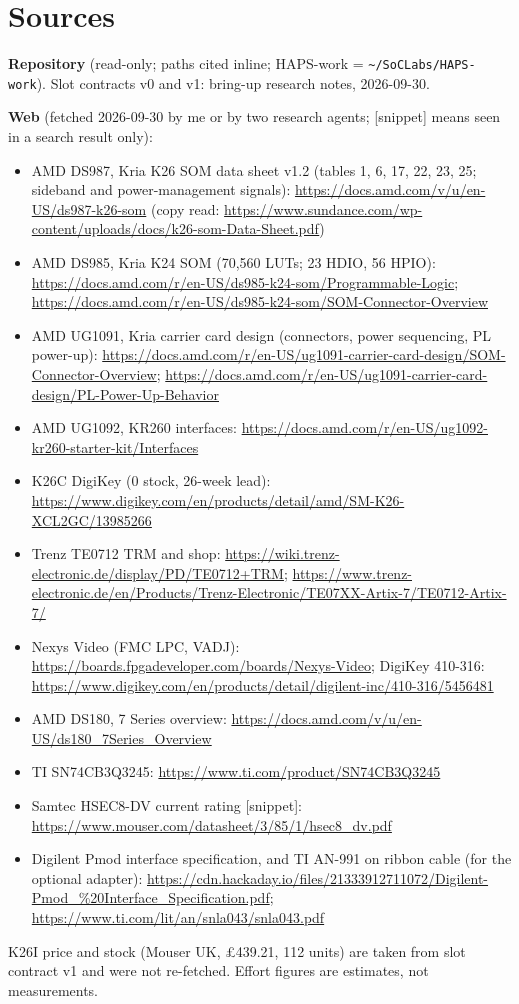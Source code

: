 \documentclass[10pt,a4paper]{article}
\newcommand\snip{\textcolor{warn}{[snippet]}}
\begin{document}
\section*{Sources}
{\scriptsize\raggedright
\textbf{Repository} (read-only; paths cited inline; HAPS-work = \texttt{\textasciitilde/SoCLabs/HAPS-work}). Slot contracts v0 and v1: bring-up research notes, 2026-09-30.\par
\textbf{Web} (fetched 2026-09-30 by me or by two research agents; \snip{} means seen in a search result only):
\begin{itemize}[leftmargin=1.2em]
\item AMD DS987, Kria K26 SOM data sheet v1.2 (tables 1, 6, 17, 22, 23, 25; sideband and power-management signals): \url{https://docs.amd.com/v/u/en-US/ds987-k26-som} (copy read: \url{https://www.sundance.com/wp-content/uploads/docs/k26-som-Data-Sheet.pdf})
\item AMD DS985, Kria K24 SOM (70,560 LUTs; 23 HDIO, 56 HPIO): \url{https://docs.amd.com/r/en-US/ds985-k24-som/Programmable-Logic}; \url{https://docs.amd.com/r/en-US/ds985-k24-som/SOM-Connector-Overview}
\item AMD UG1091, Kria carrier card design (connectors, power sequencing, PL power-up): \url{https://docs.amd.com/r/en-US/ug1091-carrier-card-design/SOM-Connector-Overview}; \url{https://docs.amd.com/r/en-US/ug1091-carrier-card-design/PL-Power-Up-Behavior}
\item AMD UG1092, KR260 interfaces: \url{https://docs.amd.com/r/en-US/ug1092-kr260-starter-kit/Interfaces}
\item K26C DigiKey (0 stock, 26-week lead): \url{https://www.digikey.com/en/products/detail/amd/SM-K26-XCL2GC/13985266}
\item Trenz TE0712 TRM and shop: \url{https://wiki.trenz-electronic.de/display/PD/TE0712+TRM}; \url{https://www.trenz-electronic.de/en/Products/Trenz-Electronic/TE07XX-Artix-7/TE0712-Artix-7/}
\item Nexys Video (FMC LPC, VADJ): \url{https://boards.fpgadeveloper.com/boards/Nexys-Video}; DigiKey 410-316: \url{https://www.digikey.com/en/products/detail/digilent-inc/410-316/5456481}
\item AMD DS180, 7 Series overview: \url{https://docs.amd.com/v/u/en-US/ds180_7Series_Overview}
\item TI SN74CB3Q3245: \url{https://www.ti.com/product/SN74CB3Q3245}
\item Samtec HSEC8-DV current rating \snip: \url{https://www.mouser.com/datasheet/3/85/1/hsec8_dv.pdf}
\item Digilent Pmod interface specification, and TI AN-991 on ribbon cable (for the optional adapter): \url{https://cdn.hackaday.io/files/21333912711072/Digilent-Pmod_%20Interface_Specification.pdf}; \url{https://www.ti.com/lit/an/snla043/snla043.pdf}
\end{itemize}
K26I price and stock (Mouser UK, \pounds439.21, 112 units) are taken from slot contract v1 and were not re-fetched. Effort figures are estimates, not measurements.\par}
\end{document}
